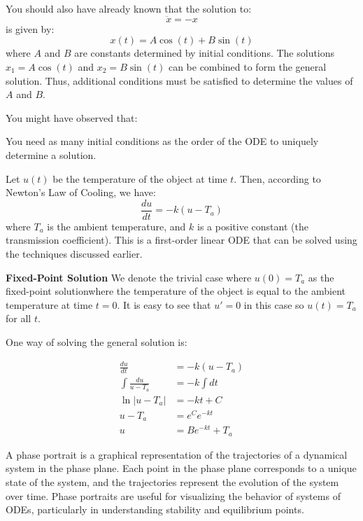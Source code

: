 \documentclass[11pt]{article}
\begin{document}
\begin{example}[Superposition]
    You should also have already known that the solution to:
    $$ \ddot{x} = -x $$
    is given by:
    $$ x(t) = A \cos(t) + B \sin(t) $$
    where \( A \) and \( B \) are constants determined by initial conditions. The solutions $x_1 = A \cos(t)$ and $x_2 = B \sin(t)$ can be combined to form the general solution. Thus, additional conditions must be satisfied to determine the values of \( A \) and \( B \).
\end{example}
You might have observed that:
\begin{theorem}
    You need as many initial conditions as the order of the ODE to uniquely determine a solution.
\end{theorem}

\begin{example}
    Let $u(t)$ be the temperature of the object at time $t$. Then, according to Newton's Law of Cooling, we have:
    $$
    \frac{du}{dt} = -k(u - T_a)
    $$
    where \( T_a \) is the ambient temperature, and \( k \) is a positive constant (the transmission coefficient). This is a first-order linear ODE that can be solved using the techniques discussed earlier.

    \textbf{Fixed-Point Solution} We denote the trivial case where \( u(0) = T_a \) as the fixed-point solutionwhere the temperature of the object is equal to the ambient temperature at time \( t = 0 \). It is easy to see that \( u' = 0 \) in this case so \( u(t) = T_a \) for all \( t \).

    One way of solving the general solution is:

    \begin{align*}
        \frac{du}{dt} &= -k(u - T_a) \\
        \int \frac{du}{u - T_a} &= -k \int dt \\
        \ln|u - T_a| &= -kt + C \\
        u - T_a &= e^C e^{-kt} \\
        u &= Be^{-kt} + T_a
    \end{align*}

\end{example}

\begin{definition}
    A phase portrait is a graphical representation of the trajectories of a dynamical system in the phase plane. Each point in the phase plane corresponds to a unique state of the system, and the trajectories represent the evolution of the system over time. Phase portraits are useful for visualizing the behavior of systems of ODEs, particularly in understanding stability and equilibrium points.
\end{definition}
\end{document}
